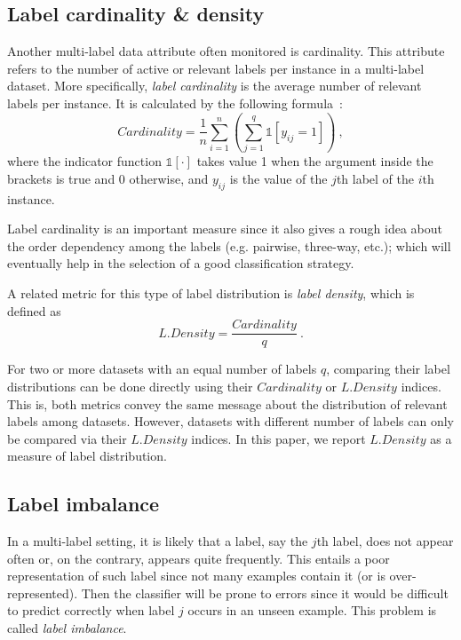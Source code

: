 \documentclass[review]{elsarticle}
\begin{document}
	\subsection{Label cardinality \& density}
	
	Another multi-label data attribute often monitored is cardinality. This attribute refers to the number of active or relevant labels per instance in a multi-label dataset. More specifically, \emph{label cardinality} is the average number of relevant labels per instance. It is calculated by the following formula~\citep{Tsoumakas:07,Gibaja:15}:
	\begin{equation}
	Cardinality = \frac{1}{n} \sum^{n}_{i=1}{\left(\sum^{q}_{j=1}{\mathds{1}\left[y_{ij} = 1 \right]}\right)}\ ,
	\end{equation}
	where the indicator function $\mathds{1}[\cdot]$ takes value 1 when the argument inside the brackets is true and 0 otherwise, and $y_{ij}$ is the value of the $j$th label of the $i$th instance.
	
	Label cardinality is an important measure since it also gives a rough idea about the order dependency among the labels (e.g. pairwise, three-way, etc.); which will eventually help in the selection of a good classification strategy.
	
	A related metric for this type of label distribution is \emph{label density}, which is defined as~\citep{Tsoumakas:07,Gibaja:15}
	\begin{equation}
	L.Density = \frac{Cardinality}{q}\ .
	\end{equation}
	
	For two or more datasets with an equal number of labels $q$, comparing their label distributions can be done directly using their $Cardinality$ or $L.Density$ indices. This is, both metrics convey the same message about the distribution of relevant labels among datasets. However, datasets with different number of labels can only be compared via their $L.Density$ indices. In this paper, we report $L.Density$ as a measure of label distribution.
	
	\subsection{Label imbalance}
	
	In a multi-label setting, it is likely that a label, say the $j$th label, does not appear often or, on the contrary, appears quite frequently. This entails a poor representation of such label since not many examples contain it (or is over-represented). Then the classifier will be prone to errors since it would be difficult to predict correctly when label $j$ occurs in an unseen example. This problem is called \emph{label imbalance}.
	
\end{document}
